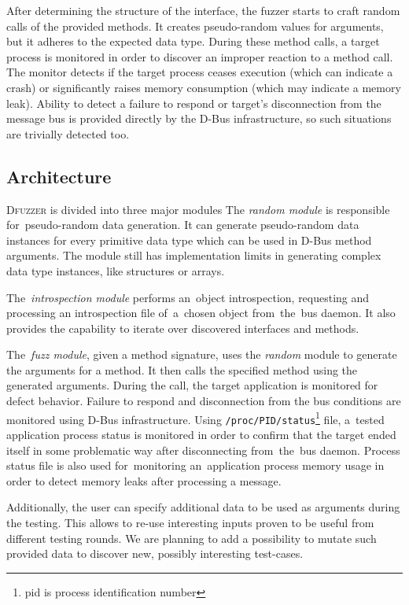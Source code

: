 \documentclass[conference]{IEEEtran}
\begin{document}
After determining the structure of the interface, the fuzzer starts to craft
random calls of the provided methods. It creates pseudo-random values for
arguments, but it adheres to the expected data type. During these method calls, a target process
is monitored in order to discover an improper reaction to a method call. The
monitor detects if the target process ceases execution (which can indicate a
crash) or significantly raises memory consumption (which may indicate a memory
leak). Ability to detect a failure to respond or target's disconnection from the
message bus is provided directly by the D-Bus infrastructure, so such situations
are trivially detected too.


\subsection{Architecture}
\textsc{Dfuzzer} is divided into three major modules The \emph{random module} is
responsible for~pseudo-random data generation. It can generate pseudo-random
data instances for every primitive data type which can be used in D-Bus method
arguments. The module still has implementation limits in generating complex data
type instances, like structures or arrays.


The~\emph{introspection module} performs an~object
introspection, requesting and processing an introspection file of~a~chosen
object from~the~bus daemon. It also provides the capability to iterate over
discovered interfaces and methods.


The~\emph{fuzz module}, given a method signature, uses the \emph{random} module
to generate the arguments for a method. It then calls the specified method
using the generated arguments. During the call, the target application is
monitored for defect behavior. Failure to respond and disconnection from the
bus conditions are monitored using D-Bus infrastructure. Using
\texttt{/proc/PID/status}\footnote{pid is process identification number} file,
a~tested application process status is monitored in order to confirm that the
target ended itself in some problematic way after disconnecting from~the~bus
daemon. Process status file is also used for~monitoring an~application process
memory usage in order to detect memory leaks after processing a message.


Additionally, the user can specify additional data to be used as arguments
during the testing. This allows to re-use interesting inputs proven to be useful
from different testing rounds. We are planning to add a possibility to mutate
such provided data to discover new, possibly interesting test-cases.
\end{document}
